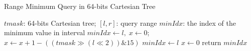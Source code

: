 \begin{algorithm}[!thb]
  \caption{Range Minimum Query in 64-bits Cartesian Tree}
  \label{alg:cartesian64bits-query}
  \begin{algorithmic}[1]
    \Require
      $\textit{tmask}$: 64-bits Cartesian tree;
      $[l, r]$: query range
    \Ensure 
      $\textit{minIdx}$: the index of the minimum value in interval
    \State $\textit{minIdx} \gets l, \; x \gets 0$;
      \State $x \gets x+1 - ((\textit{tmask} \gg (l \ll 2)) \mathrel{\&} 15)$
        \State $\textit{minIdx} \gets l$
        \State $x \gets 0$
      \EndIf
    \EndFor
    \State return $\textit{minIdx}$
  \end{algorithmic}
\end{algorithm}
